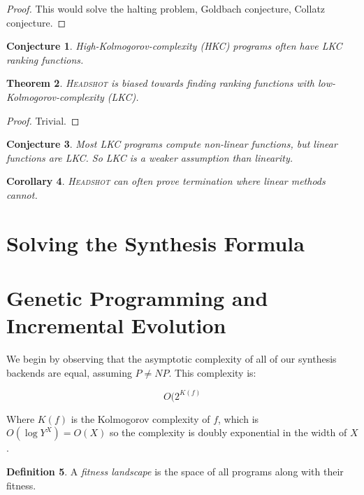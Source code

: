 \documentclass[preprint]{sigplanconf}
\newtheorem{theorem}{Theorem}
\newtheorem{corollary}[theorem]{Corollary}
\newtheorem{conjecture}[theorem]{Conjecture}
\theoremstyle{definition}
\newtheorem{definition}[theorem]{Definition}
\begin{document}
\begin{proof}
 This would solve the halting problem, Goldbach conjecture, Collatz conjecture.
\end{proof}

\begin{conjecture}
 High-Kolmogorov-complexity (HKC) programs often have LKC ranking functions.
\end{conjecture}

\begin{theorem}
 \textsc{Headshot} is biased towards finding ranking functions with
 low-Kolmogorov-complexity (LKC).
\end{theorem}

\begin{proof}
 Trivial.
\end{proof}

\begin{conjecture}
 Most LKC programs compute non-linear functions, but linear functions are LKC.
 So LKC is a weaker assumption than linearity.
\end{conjecture}

\begin{corollary}
 \textsc{Headshot} can often prove termination where linear methods cannot.
\end{corollary}



\section{Solving the Synthesis Formula}


\section{Genetic Programming and Incremental Evolution}

We begin by observing that the asymptotic complexity of all of our synthesis
backends are equal, assuming $P \neq NP$.  This complexity is:

$$O(2^{K(f)}$$

Where $K(f)$ is the Kolmogorov complexity of $f$, which is $O(\log Y^X) = O(X)$
so the complexity is doubly exponential in the width of $X$.

\begin{definition}
 A \emph{fitness landscape} is the space of all programs along with their fitness.
\end{definition}
\end{document}
